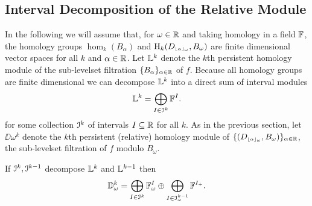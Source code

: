 \subsection{Interval Decomposition of the Relative Module}

In the following we will assume that, for $\omega\in\mathbb{R}$ and taking homology in a field $\mathbb{F}$, the homology groups $\hom_k(B_\alpha)$ and $\mathrm{H}_k(D_{\scriptscriptstyle \lfloor\alpha\rfloor_{\omega}}, B_\omega)$ are finite dimensional vector spaces for all $k$ and $\alpha\in\mathbb{R}$.
Let $\mathbb{L}^k$ denote the $k$th persistent homology module of the sub-levelset filtration $\{B_\alpha\}_{\alpha\in\mathbb{R}}$ of $f$.
Because all homology groups are finite dimensional we can decompose $\mathbb{L}^k$ into a direct sum of interval modules
\[ \mathbb{L}^k = \bigoplus_{I\in\mathcal{I}^k} \mathbb{F}^I.\] %
for some collection $\mathcal{I}^k$ of intervals $I\subseteq \mathbb{R}$ for all $k$.
As in the previous section, let $\DD{\omega}^k$ denote the $k$th persistent (relative) homology module of $\{(D_{\scriptscriptstyle \lfloor\alpha\rfloor_{\omega}},B_\omega)\}_{\alpha\in\mathbb{R}}$, the sub-levelset filtration of $f$ modulo $B_\omega$.

\begin{lemma}
  If $\mathcal{I}^k, \mathcal{I}^{k-1}$ decompose $\mathbb{L}^k$ and $\mathbb{L}^{k-1}$ then
  \[\mathbb{D}_{\omega}^k = \bigoplus_{I\in\mathcal{I}^k} \mathbb{F}_\omega^I \oplus \bigoplus_{I\in \mathcal{I}_\omega^{k-1}} \mathbb{F}^{I_+}.\]
\end{lemma}

